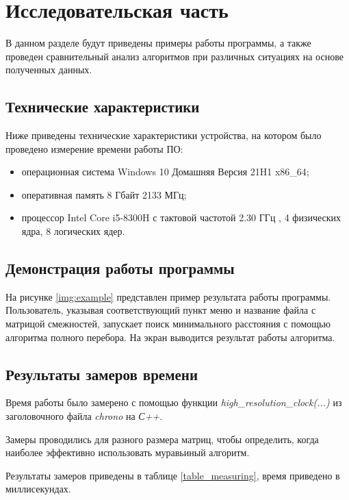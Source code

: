 \chapter{Исследовательская часть}
В данном разделе будут приведены примеры работы программы, а также проведен сравнительный анализ алгоритмов при различных ситуациях на основе полученных данных.


\section{Технические характеристики}

Ниже приведены технические характеристики устройства, на котором было проведено измерение времени работы ПО:

\begin{itemize}
	\item операционная система Windows 10 Домашняя Версия 21H1 \cite{windows} x86\_64;
	\item оперативная память 8 Гбайт 2133 МГц;
	\item процессор Intel Core i5-8300H с тактовой частотой 2.30 ГГц \cite{intel}, 4 физических ядра, 8 логических ядер.
\end{itemize}

\section{Демонстрация работы программы}

На рисунке \ref{img:example} представлен пример результата работы программы. Пользователь, указывая соответствующий пункт меню и название файла с матрицой смежностей, запускает поиск минимального расстояния с помощью алгоритма полного перебора. 
На экран выводится результат работы алгоритма.

\pagebreak

\section{Результаты замеров времени}

Время работы было замерено с помощью функции \textit{high\_resolution\_clock(...)} из заголовочного файла \textit{chrono} на \textit{С++}.

Замеры проводились для разного размера матриц, чтобы определить, когда наиболее эффективно использовать муравьиный алгоритм.

Результаты замеров приведены в таблице \ref{table_measuring}, время приведено в миллисекундах.


